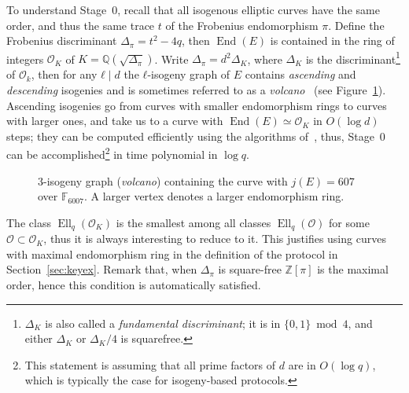 \documentclass{article}
\newcommand{\F}{\mathbb{F}}
\renewcommand{\O}{\mathcal{O}}
\theoremstyle{definition}
\DeclareMathOperator{\End}{End}
\DeclareMathOperator{\Ell}{Ell}
\begin{document}
To understand Stage~0, recall that all isogenous elliptic curves have
the same order, and thus the same trace $t$ of the Frobenius
endomorphism $π$. Define the Frobenius discriminant $Δ_π=t^2-4q$, then
$\End(E)$ is contained in the ring of integers $\O_K$ of
$K=ℚ(\sqrt{Δ_π})$. Write $Δ_π=d^2Δ_K$, where $Δ_K$ is the
discriminant\footnote{$Δ_K$ is also called a \emph{fundamental
    discriminant}; it is in $\{0,1\}\bmod 4$, and either $Δ_K$ or
  $Δ_K/4$ is squarefree.} of $\O_k$, then for any $ℓ\mid d$ the
$ℓ$-isogeny graph of $E$ contains \emph{ascending} and
\emph{descending} isogenies and is sometimes referred to as a
\emph{volcano}~\cite{fouquet+morain02} (see Figure~\ref{fig:volcano}).
Ascending isogenies go from curves with smaller endomorphism rings to
curves with larger ones, and take us to a curve with $\End(E)≃\O_K$ in
$O(\log d)$ steps; they can be computed efficiently using the
algorithms
of~\cite{kohel,fouquet+morain02,ionica+joux13,defeo2016explicit},
thus, Stage~0 can be accomplished\footnote{This statement is assuming
  that all prime factors of $d$ are in $O(\log q)$, which is typically
  the case for isogeny-based protocols.}  in time polynomial in
$\log q$.

\begin{figure}
  \centering
  \caption{$3$-isogeny graph (\emph{volcano}) containing the curve
    with $j(E)=607$ over $\F_{6007}$. A larger vertex denotes a larger
    endomorphism ring.}
  \label{fig:volcano}
\end{figure}

The class $\Ell_q(\O_K)$ is the smallest among all classes
$\Ell_q(\O)$ for some $\O⊂\O_K$, thus it is always interesting to
reduce to it. This justifies using curves with maximal endomorphism
ring in the definition of the protocol in
Section~\ref{sec:keyex}. Remark that, when $Δ_π$ is square-free $ℤ[π]$
is the maximal order, hence this condition is automatically satisfied.
\end{document}
